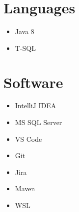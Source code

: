 \documentclass[letterpaper,11pt]{article}
\begin{document}
\hspace{0.2cm}
\begin{minipage}[t]{0.15\linewidth}
	\section{Languages}
	\begin{itemize}[leftmargin=*]
		\item Java 8
		\item T-SQL
	\end{itemize}
	\section{Software}
	\begin{itemize}[leftmargin=*]
		\item IntelliJ IDEA
		\item MS SQL Server
		\item VS Code
		\item Git
		\item Jira
		\item Maven
		\item WSL
	\end{itemize}
\end{minipage}







\end{document}
